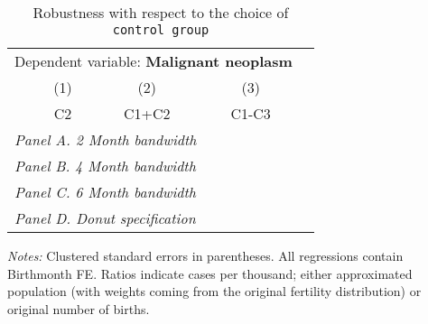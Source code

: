  \begin{table}[H] \begin{threeparttable} \centering \caption{Robustness with respect to the choice of \texttt{control group}} {\def\sym#1{\ifmmode^{#1}\else\(^{#1}\)\fi} \begin{tabular}{l*{4}{c}} \toprule \multicolumn{4}{c}{Dependent variable: \textbf{Malignant neoplasm}} \\ \cmidrule(lr){2-4}
            &\multicolumn{1}{c}{(1)}&\multicolumn{1}{c}{(2)}&\multicolumn{1}{c}{(3)}\\
            &\multicolumn{1}{c}{C2}&\multicolumn{1}{c}{C1+C2}&\multicolumn{1}{c}{C1-C3}\\
\midrule
 \multicolumn{4}{l}{\emph{Panel A. 2 Month bandwidth}} \\    \midrule\multicolumn{4}{l}{\emph{Panel B. 4 Month bandwidth}} \\    \midrule\multicolumn{4}{l}{\emph{Panel C. 6 Month bandwidth}} \\    \midrule\multicolumn{4}{l}{\emph{Panel D. Donut specification}} \\    
\bottomrule \end{tabular} } \begin{tablenotes} \item \scriptsize \emph{Notes:} Clustered standard errors in parentheses. All regressions contain Birthmonth FE. Ratios indicate cases per thousand; either approximated population (with weights coming from the original fertility distribution) or original number of births. \end{tablenotes} \end{threeparttable} \end{table} 
